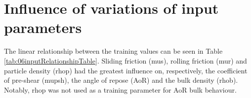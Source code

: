 
\chapter{Influence of variations of input parameters}
\label{cap:influence}




The linear relationship between the
training values can be seen in Table \ref{tab:06inputRelationshipTable}.
Sliding friction (\ac{mus}), rolling friction (\ac{mur}) and particle density (\ac{rhop})
had the greatest influence on, respectively, the coefficient of pre-shear
(\ac{mupsh}), the angle of repose  (\ac{AoR}) and the bulk density (\ac{rhob}). Notably, \ac{rhop}
was not used as a training parameter for \ac{AoR} bulk behaviour. 

